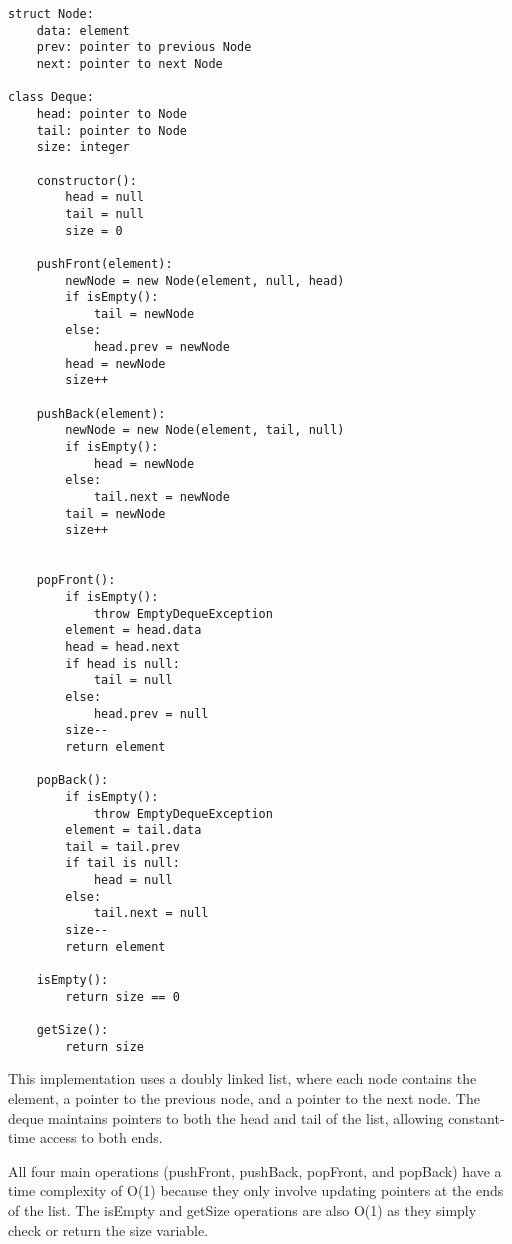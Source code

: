 \documentclass{cs1204}
\begin{document}
\begin{verbatim}
struct Node:
    data: element
    prev: pointer to previous Node
    next: pointer to next Node

class Deque:
    head: pointer to Node
    tail: pointer to Node
    size: integer

    constructor():
        head = null
        tail = null
        size = 0

    pushFront(element):
        newNode = new Node(element, null, head)
        if isEmpty():
            tail = newNode
        else:
            head.prev = newNode
        head = newNode
        size++

    pushBack(element):
        newNode = new Node(element, tail, null)
        if isEmpty():
            head = newNode
        else:
            tail.next = newNode
        tail = newNode
        size++

        
    popFront():
        if isEmpty():
            throw EmptyDequeException
        element = head.data
        head = head.next
        if head is null:
            tail = null
        else:
            head.prev = null
        size--
        return element

    popBack():
        if isEmpty():
            throw EmptyDequeException
        element = tail.data
        tail = tail.prev
        if tail is null:
            head = null
        else:
            tail.next = null
        size--
        return element

    isEmpty():
        return size == 0

    getSize():
        return size
\end{verbatim}

This implementation uses a doubly linked list, where each node contains the element, a pointer to the previous node, and a pointer to the next node. The deque maintains pointers to both the head and tail of the list, allowing constant-time access to both ends.

All four main operations (pushFront, pushBack, popFront, and popBack) have a time complexity of O(1) because they only involve updating pointers at the ends of the list. The isEmpty and getSize operations are also O(1) as they simply check or return the size variable.
\end{document}
